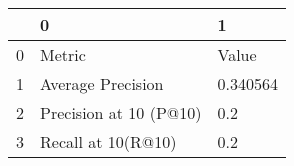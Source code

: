 \begin{tabular}{lll}
\toprule
{} &                       0 &         1 \\
\midrule
0 &                  Metric &     Value \\
1 &       Average Precision &  0.340564 \\
2 &  Precision at 10 (P@10) &       0.2 \\
3 &      Recall at 10(R@10) &       0.2 \\
\bottomrule
\end{tabular}
